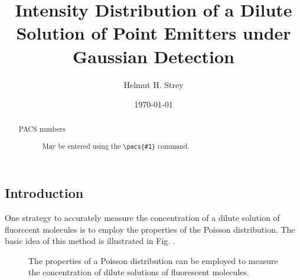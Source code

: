\documentclass[%
 reprint,
 amsmath,amssymb,
 aps,
]{revtex4-1}
\begin{document}

\title{Intensity Distribution of a Dilute Solution of Point Emitters under Gaussian Detection}

\author{Helmut H. Strey}

\date{\today}%

\begin{abstract}
\begin{description}
\item[PACS numbers]
May be entered using the \verb+\pacs{#1}+ command.
\end{description}
\end{abstract}

\maketitle

\onecolumngrid
\subsection{Introduction}
One strategy to accurately measure the concentration of a dilute solution of fluorecent molecules is to employ the properties of the Poisson distribution.  The basic idea of this method is illustrated in Fig. \cite{poissonconc}.  
\begin{figure}[H]
\begin{center}
\caption{The properties of a Poisson distribution can be employed to measure the concentration of dilute solutions of fluorescent molecules.}\label{fig:poissonconc}
\end{center}
\end{figure}
\end{document}

